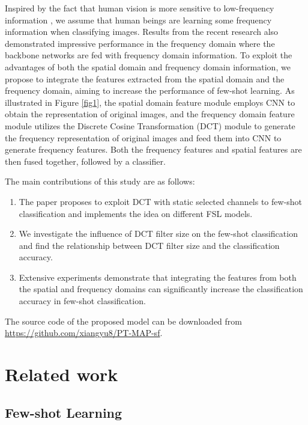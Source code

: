 \documentclass[10pt, conference, compsocconf]{IEEEtran}
\begin{document}
Inspired by the fact that human vision is more sensitive to low-frequency information {}{\cite{kim2017deep, XuKai2020}}, we assume that human beings are learning some frequency information when classifying images. Results from the recent research \cite{XuKai2020} also demonstrated impressive performance in the frequency domain where the backbone networks are fed with frequency domain information. To exploit the advantages of both the spatial domain and frequency domain information, we propose to integrate the features extracted from the spatial domain and the frequency domain, aiming to increase the performance of few-shot learning. As illustrated in Figure \ref{fig1}, the spatial domain feature module employs CNN to obtain the representation of original images, and the frequency domain feature module utilizes the Discrete Cosine Transformation (DCT) module \cite{ahmed1974discrete} to generate the frequency representation of original images and feed them into CNN to generate frequency features. Both the frequency features and spatial features are then fused together, followed by a classifier. 

The main contributions of this study are as follows: 
\begin{enumerate}
\item The paper proposes to exploit DCT with static selected channels to few-shot classification and implements the idea on different FSL models. 
\item We investigate the influence of DCT filter size on the few-shot classification and find the relationship between DCT filter size and the classification accuracy.
\item Extensive experiments demonstrate that integrating the features from both the spatial and frequency domains can significantly increase the classification accuracy in few-shot classification. 

\end{enumerate}
The source code of the proposed model can be downloaded from  {\url{https://github.com/xiangyu8/PT-MAP-sf}}.

\section{Related work}

\subsection{Few-shot Learning}
\end{document}
